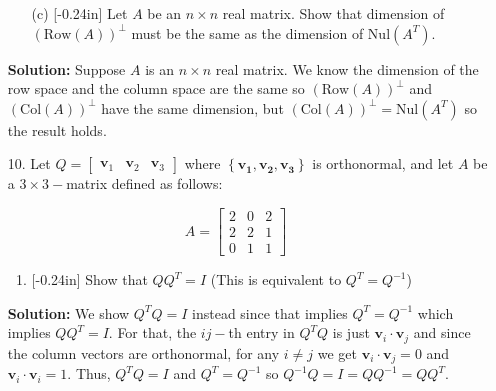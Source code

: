 \documentclass[letterpaper,12pt]{article}
\newcommand{\set}[1]{\left\{ #1 \right\}}
\theoremstyle{definition}
\begin{document}
\newpage
\begin{enumerate}
    \item[] \begin{enumerate}
        \item[(c)]\reversemarginpar{}[-0.24in] Let $A$ be an $n\times n$ real matrix. Show that dimension of $(\mathrm{Row}(A))^\perp$ must be the same as 
        the dimension of $\mathrm{Nul}(A^T)$. 
    \end{enumerate}
    \begin{mdframed}
        \textbf{Solution:} Suppose $A$ is an $n\times n$ real matrix. We know the dimension of the row space and the column space are the same so $(\mathrm{Row}(A))^\perp$ and $(\mathrm{Col}(A))^\perp$ have the same dimension, but $(\mathrm{Col}(A))^\perp = \mathrm{Nul}(A^T)$ so the result holds.
    \end{mdframed}
\end{enumerate}
\newpage
\begin{enumerate}
    \item[10.] Let $Q = \begin{bmatrix}
        \mathbf{v}_1 & \mathbf{v}_2 & \mathbf{v}_3 
    \end{bmatrix}$ where $\set{\mathbf{v_1},\mathbf{v_2},\mathbf{v_3}}$ is orthonormal, and let $A$ be a $3\times3-$matrix defined as follows: 
\end{enumerate}
 $$A=\begin{bmatrix}
     2 & 0 & 2 \\ 2 & 2 & 1 \\ 0& 1 & 1
 \end{bmatrix}$$
    \begin{enumerate}
        \item[] \begin{enumerate}
            \item \reversemarginpar{}[-0.24in]  Show that $QQ^T = I$ (This is equivalent to $Q^T = Q^{-1}$)
        \end{enumerate}
            \begin{mdframed}
        \textbf{Solution:} We show $Q^TQ = I$ instead since that implies $Q^T = Q^{-1}$ which implies $QQ^T = I$. For that, the $ij-$th entry in $Q^TQ $ is just $\mathbf{v}_i\cdot\mathbf{v}_j$ and since the column vectors are orthonormal, for any $i \neq j$ we get $\mathbf{v}_i\cdot\mathbf{v}_j = 0$ and $\mathbf{v}_i\cdot\mathbf{v}_i = 1$. Thus, $Q^TQ = I$ and $Q^T = Q^{-1}$ so $Q^{-1}Q = I = QQ^{-1} =QQ^T$.
    \end{mdframed}
    \end{enumerate}
\end{document}
